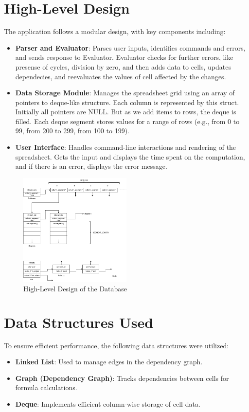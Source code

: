 \documentclass{article}
\begin{document}
\section{High-Level Design}
The application follows a modular design, with key components including:
\begin{itemize}
    \item \textbf{Parser and Evaluator}: Parses user inputs, identifies commands and errors, and sends response to Evaluator. Evaluator checks for further errors, like presense of cycles, division by zero, and then adds data to cells, updates dependecies, and reevaluates the values of cell affected by the changes.
    \item \textbf{Data Storage Module}: Manages the spreadsheet grid using an array of pointers to deque-like structure. Each column is represented by this struct. Initially all pointers are NULL. But as we add items to rows, the deque is filled. Each deque segment stores values for a range of rows (e.g., from 0 to 99, from 200 to 299, from 100 to 199).
    \item \textbf{User Interface}: Handles command-line interactions and rendering of the spreadsheet. Gets the input and displays the time spent on the computation, and if there is an error, displays the error message.
\end{itemize}

\begin{figure}[ht]
    \centering
    \includegraphics[width=0.5\textwidth]{docs/hld.png}
    \caption{High-Level Design of the Database}
    \label{fig:high_level_design}
\end{figure}

\section{Data Structures Used}
To ensure efficient performance, the following data structures were utilized:
\begin{itemize}
    \item \textbf{Linked List}: Used to manage edges in the dependency graph.
    \item \textbf{Graph (Dependency Graph)}: Tracks dependencies between cells for formula calculations.
    \item \textbf{Deque}: Implements efficient column-wise storage of cell data.
\end{itemize}
\end{document}
